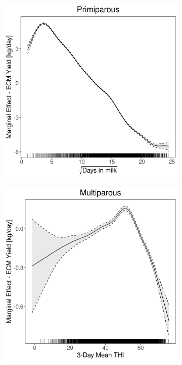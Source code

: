 \begin{figure}[H]
\begin{subfigure}[b]{0.45\textwidth}
    \end{subfigure}
    \hspace{0.05\textwidth} %
    \begin{subfigure}[b]{0.45\textwidth}
        \centering
        \includegraphics[width=\textwidth]{thesis/figures/models/ecm/full/bs_ecm_full/bs_ecm_full_marginal_dim_milk_primi.png}
    \end{subfigure}
    \begin{subfigure}[b]{0.45\textwidth}
        \centering
        \includegraphics[width=\textwidth]{thesis/figures/models/ecm/full/bs_ecm_full/bs_ecm_full_marginal_thi_milk_multi.png}

\end{subfigure}
\end{figure}
